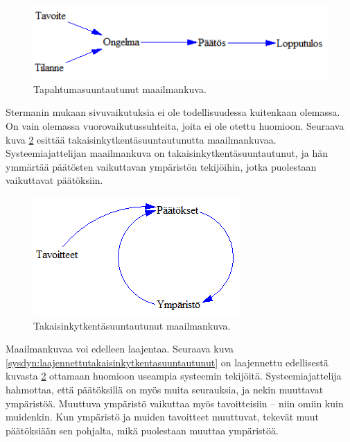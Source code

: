 \documentclass[finnish,12pt,a4paper,pdftex]{article}
\begin{document}
\begin{onehalfspacing}
\begin{figure}[H]
\centering \includegraphics{tapahtuma}
\caption{Tapahtumasuuntautunut maailmankuva. \cite[s. 10]{Sterman2000} \label{sysdyn:tapahtumasuuntautunut}}
\end{figure}

Stermanin \cite[s. 11]{Sterman2000} mukaan sivuvaikutuksia ei ole todellisuudessa kuitenkaan olemassa. On vain olemassa vuorovaikutussuhteita, joita ei ole otettu huomioon. Seuraava kuva \ref{sysdyn:takaisinkytkentasuuntautunut} esittää takaisinkytkentäsuuntautunutta maailmankuvaa. Systeemiajattelijan maailmankuva on takaisinkytkentäsuuntautunut, ja hän ymmärtää päätösten vaikuttavan ympäristön tekijöihin, jotka puolestaan vaikuttavat päätöksiin. 

\begin{figure}[H]
\centering \includegraphics{takaisinkytkentasuuntautunut}
\caption{Takaisinkytkentäsuuntautunut maailmankuva. \cite[s. 11]{Sterman2000} \label{sysdyn:takaisinkytkentasuuntautunut}}
\end{figure}

Maailmankuvaa voi edelleen laajentaa. Seuraava kuva \ref{sysdyn:laajennettutakaisinkytkentasuuntautunut} on laajennettu edellisestä kuvasta \ref{sysdyn:takaisinkytkentasuuntautunut} ottamaan huomioon useampia systeemin tekijöitä. Systeemiajattelija hahmottaa, että päätöksillä on myös muita seurauksia, ja nekin muuttavat ympäristöä. Muuttuva ympäristö vaikuttaa myös tavoitteisiin -- niin omiin kuin muidenkin. Kun ympäristö ja muiden tavoitteet muuttuvat, tekevät muut päätöksiään sen pohjalta, mikä puolestaan muuttaa ympäristöä. \cite[s. 11--12]{Sterman2000}


\end{onehalfspacing}
\end{document}
